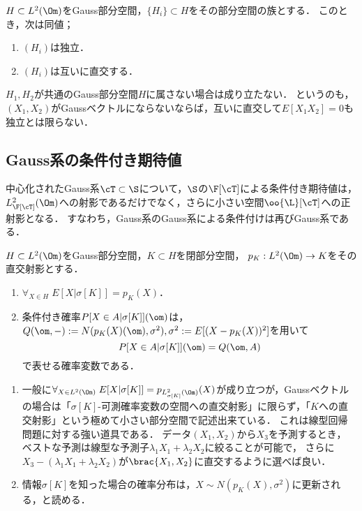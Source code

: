 \documentclass[uplatex,dvipdfmx]{jsreport}
\begin{document}
\begin{theorem}[部分空間が独立であることの直交性による特徴付け]
    $H\subset L^2(\Om)$をGauss部分空間，$\{H_i\}\subset H$をその部分空間の族とする．
    このとき，次は同値；
    \begin{enumerate}
        \item $(H_i)$は独立．
        \item $(H_i)$は互いに直交する．
    \end{enumerate}
\end{theorem}
\begin{remark}
    $H_1,H_2$が共通のGauss部分空間$H$に属さない場合は成り立たない．
    というのも，$(X_1,X_2)$がGaussベクトルにならないならば，互いに直交して$E[X_1X_2]=0$も独立とは限らない．
\end{remark}

\subsection{Gauss系の条件付き期待値}

\begin{tcolorbox}[colframe=ForestGreen, colback=ForestGreen!10!white,breakable,colbacktitle=ForestGreen!40!white,coltitle=black,fonttitle=\bfseries\sffamily,
title=]
    中心化されたGauss系$\cT\subset\S$について，$\S$の$\F[\cT]$による条件付き期待値は，
    $L^2_{\F[\cT]}(\Om)$への射影であるだけでなく，さらに小さい空間$\oo{\L}[\cT]$への正射影となる．
    すなわち，Gauss系のGauss系による条件付けは再びGauss系である．
\end{tcolorbox}

\begin{corollary}
    $H\subset L^2(\Om)$をGauss部分空間，$K\subset H$を閉部分空間，
    $p_K:L^2(\Om)\to K$をその直交射影とする．
    \begin{enumerate}
        \item $\forall_{X\in H}\;E[X|\sigma[K]]=p_K(X)$．
        \item 条件付き確率$P[X\in A|\sigma[K]](\om)$は，$Q(\om,-):=N(p_K(X)(\om),\sigma^2),\sigma^2:=E[(X-p_K(X))^2]$を用いて
        \[P[X\in A|\sigma[K]](\om)=Q(\om,A)\]
        で表せる確率変数である．
    \end{enumerate}
\end{corollary}
\begin{remarks}\mbox{}
    \begin{enumerate}
        \item 一般に$\forall_{X\in L^2(\Om)}\;E[X|\sigma[K]]=p_{L^2_{\sigma[K]}(\Om)}(X)$が成り立つが，Gaussベクトルの場合は「$\sigma[K]$-可測確率変数の空間への直交射影」に限らず，「$K$への直交射影」という極めて小さい部分空間で記述出来ている．
        これは線型回帰問題に対する強い道具である．
        データ$(X_1,X_2)$から$X_3$を予測するとき，
        ベストな予測は線型な予測子$\lambda_1 X_1+\lambda_2X_2$に絞ることが可能で，
        さらに$X_3-(\lambda_1X_1+\lambda_2X_2)$が$\brac{X_1,X_2}$に直交するように選べば良い．
        \item 情報$\sigma[K]$を知った場合の確率分布は，$X\sim N(p_K(X),\sigma^2)$に更新される，と読める．
    \end{enumerate}
\end{remarks}
\end{document}
